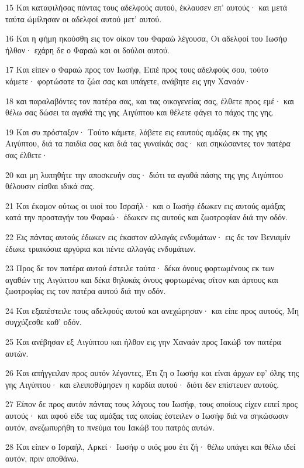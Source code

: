 \par 15 Και καταφιλήσας πάντας τους αδελφούς αυτού, έκλαυσεν επ' αυτούς· και μετά ταύτα ώμίλησαν οι αδελφοί αυτού μετ' αυτού.
\par 16 Και η φήμη ηκούσθη εις τον οίκον του Φαραώ λέγουσα, Οι αδελφοί του Ιωσήφ ήλθον· εχάρη δε ο Φαραώ και οι δούλοι αυτού.
\par 17 Και είπεν ο Φαραώ προς τον Ιωσήφ, Ειπέ προς τους αδελφούς σου, τούτο κάμετε· φορτώσατε τα ζώα σας και υπάγετε, ανάβητε εις γην Χαναάν·
\par 18 και παραλαβόντες τον πατέρα σας, και τας οικογενείας σας, έλθετε προς εμέ· και θέλω σας δώσει τα αγαθά της γης Αιγύπτου και θέλετε φάγει το πάχος της γης.
\par 19 Και συ πρόσταξον· Τούτο κάμετε, λάβετε εις εαυτούς αμάξας εκ της γης Αιγύπτου, διά τα παιδία σας και διά τας γυναίκάς σας· και σηκώσαντες τον πατέρα σας έλθετε·
\par 20 και μη λυπηθήτε την αποσκευήν σας· διότι τα αγαθά πάσης της γης Αιγύπτου θέλουσιν είσθαι ιδικά σας.
\par 21 Και έκαμον ούτως οι υιοί του Ισραήλ· και ο Ιωσήφ έδωκεν εις αυτούς αμάξας κατά την προσταγήν του Φαραώ· έδωκεν εις αυτούς και ζωοτροφίαν διά την οδόν.
\par 22 Εις πάντας αυτούς έδωκεν εις έκαστον αλλαγάς ενδυμάτων· εις δε τον Βενιαμίν έδωκε τριακόσια αργύρια και πέντε αλλαγάς ενδυμάτων.
\par 23 Προς δε τον πατέρα αυτού έστειλε ταύτα· δέκα όνους φορτωμένους εκ των αγαθών της Αιγύπτου και δέκα θηλυκάς όνους φορτωμένας σίτον και άρτους και ζωοτροφίας εις τον πατέρα αυτού διά την οδόν.
\par 24 Και εξαπέστειλε τους αδελφούς αυτού και ανεχώρησαν· και είπε προς αυτούς, Μη συγχύζεσθε καθ' οδόν.
\par 25 Και ανέβησαν εξ Αιγύπτου και ήλθον εις γην Χαναάν προς Ιακώβ τον πατέρα αυτών.
\par 26 Και απήγγειλαν προς αυτόν λέγοντες, Έτι ζη ο Ιωσήφ και είναι άρχων εφ' όλης της γης Αιγύπτου· και ελειποθύμησεν η καρδία αυτού· διότι δεν επίστευεν αυτούς.
\par 27 Είπον δε προς αυτόν πάντας τους λόγους του Ιωσήφ, τους οποίους είχεν ειπεί προς αυτούς· και αφού είδε τας αμάξας τας οποίας έστειλεν ο Ιωσήφ διά να σηκώσωσιν αυτόν, ανεζωπυρήθη το πνεύμα του Ιακώβ του πατρός αυτών.
\par 28 Και είπεν ο Ισραήλ, Αρκεί· Ιωσήφ ο υιός μου έτι ζή· θέλω υπάγει και θέλω ιδεί αυτόν, πριν αποθάνω.

